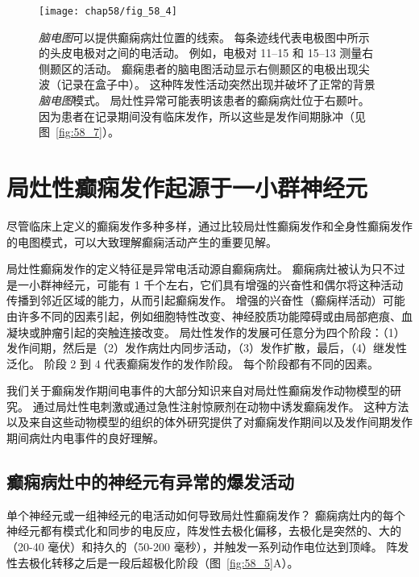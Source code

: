 \begin{figure}[htbp]
	\centering
	\texttt{[image: chap58/fig\_58\_4]}
	\caption{\textit{脑电图}可以提供癫痫病灶位置的线索。
		每条迹线代表电极图中所示的头皮电极对之间的电活动。
		例如，电极对 11–15 和 15–13 测量右侧颞区的活动。
		癫痫患者的脑电图活动显示右侧颞区的电极出现尖波（记录在盒子中）。
		这种阵发性活动突然出现并破坏了正常的背景\textit{脑电图}模式。
		局灶性异常可能表明该患者的癫痫病灶位于右颞叶。
		因为患者在记录期间没有临床发作，所以这些是发作间期脉冲（见图~\ref{fig:58_7}）\cite{lothman1990seizures}。}
	\label{fig:58_4}
\end{figure}



\section{局灶性癫痫发作起源于一小群神经元}

尽管临床上定义的癫痫发作多种多样，通过比较局灶性癫痫发作和全身性癫痫发作的电图模式，可以大致理解癫痫活动产生的重要见解。


局灶性癫痫发作的定义特征是异常电活动源自癫痫病灶。
癫痫病灶被认为只不过是一小群神经元，可能有 1 千个左右，它们具有增强的兴奋性和偶尔将这种活动传播到邻近区域的能力，从而引起癫痫发作。
增强的兴奋性（癫痫样活动）可能由许多不同的因素引起，例如细胞特性改变、神经胶质功能障碍或由局部疤痕、血凝块或肿瘤引起的突触连接改变。
局灶性发作的发展可任意分为四个阶段：（1）发作间期，然后是（2）发作病灶内同步活动，（3）发作扩散，最后，（4）继发性泛化。
阶段 2 到 4 代表癫痫发作的发作阶段。
每个阶段都有不同的因素。


我们关于癫痫发作期间电事件的大部分知识来自对局灶性癫痫发作动物模型的研究。
通过局灶性电刺激或通过急性注射惊厥剂在动物中诱发癫痫发作。
这种方法以及来自这些动物模型的组织的体外研究提供了对癫痫发作期间以及发作间期发作期间病灶内电事件的良好理解。



\subsection{癫痫病灶中的神经元有异常的爆发活动}

单个神经元或一组神经元的电活动如何导致局灶性癫痫发作？
癫痫病灶内的每个神经元都有模式化和同步的电反应，阵发性去极化偏移，去极化是突然的、大的（20-40 毫伏）和持久的（50-200 毫秒），并触发一系列动作电位达到顶峰。
阵发性去极化转移之后是一段后超极化阶段（图~\ref{fig:58_5}A）。


